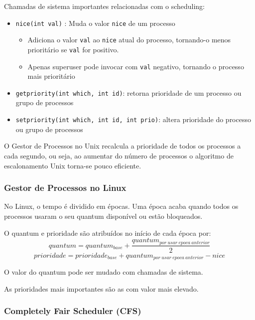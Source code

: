\documentclass[11pt]{article}
\begin{document}
Chamadas de sistema importantes relacionadas com o scheduling:
\begin{itemize}
    \item \lstinline|nice(int val)| : Muda o valor \lstinline|nice| de um processo
          \begin{itemize}[topsep=-2pt]
              \item Adiciona o valor \lstinline|val| ao \lstinline|nice| atual do processo, tornando-o menos prioritário se \lstinline|val| for positivo.
              \item Apenas superuser pode invocar com \lstinline|val| negativo, tornando o processo mais prioritário
          \end{itemize}
    \item \lstinline|getpriority(int which, int id)|: retorna prioridade de um processo ou grupo de processos
    \item \lstinline|setpriority(int which, int id, int prio)|: altera prioridade do processo ou grupo de processos
\end{itemize}

O Gestor de Processos no Unix recalcula a prioridade de todos os processos a cada segundo, ou seja, ao aumentar do número de processos o algoritmo de escalonamento Unix torna-se pouco eficiente.

\subsubsection{Gestor de Processos no Linux}

No Linux, o tempo é dividido em épocas. Uma época acaba quando todos os processos usaram o seu quantum disponível ou estão bloqueados.

O quantum e prioridade são atribuídos no início de cada época por:
\begin{equation*}
    quantum = quantum_{base} +
    \frac{quantum_{por\ usar\ epoca\ anterior}}{2}
\end{equation*}
\begin{equation*}
    prioridade = prioridade_{base} + quantum_{por\ usar\ epoca\ anterior} - nice
\end{equation*}

O valor do quantum pode ser mudado com chamadas de sistema.

As prioridades mais importantes são as com valor mais elevado.

\subsubsection{Completely Fair Scheduler (CFS)}
\end{document}
